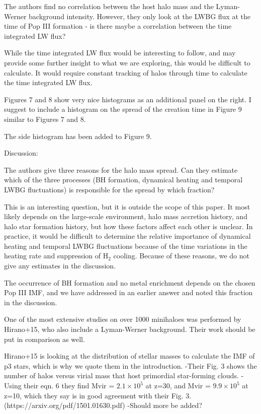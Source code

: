 \documentclass[11pt]{article}
\newenvironment{referee}[1][]{%
    \ignorespaces%
    \begin{mdframed}[style=myquotestyle,#1]%
}{%
    \end{mdframed}%
    \ignorespacesafterend%
}%
\begin{document}
\begin{referee}
The authors find no correlation between the host halo mass and the Lyman-Werner background intensity. However, they only look at the LWBG flux at the time of Pop III formation - is there maybe a correlation between the time integrated LW flux?
\end{referee}
While the time integrated LW flux would be interesting to follow, and may provide some further insight to what we are exploring, this would be difficult to calculate. It would require constant tracking of halos through time to calculate the time integrated LW flux. 

\begin{referee}
Figures 7 and 8 show very nice histograms as an additional panel on the right.  I suggest to include a histogram on the spread of the creation time in Figure 9 similar to Figures 7 and 8.
\end{referee}
The side histogram has been added to Figure 9. 

\begin{referee}
Discussion:

The authors give three reasons for the halo mass spread. Can they estimate which of the three processes (BH formation, dynamical heating and temporal LWBG fluctuations) is responsible for the spread by which fraction?
\end{referee}

This is an interesting question, but it is outside the scope of this paper.  It most likely depends on the large-scale environment, halo mass accretion history, and halo star formation history, but how these factors affect each other is unclear.  In practice, it would be difficult to determine the relative importance of dynamical heating and temporal LWBG fluctuations because of the time variations in the heating rate and suppression of H$_2$ cooling.  Because of these reasons, we do not give any estimates in the discussion.

The occurrence of BH formation and no metal enrichment depends on the chosen Pop III IMF, and we have addressed in an earlier answer and noted this fraction in the discussion.

\begin{referee}
One of the most extensive studies on over 1000 minihaloes was performed by Hirano+15, who also include a Lyman-Werner background. Their work should be put in comparison as well.
\end{referee}
Hirano+15 is looking at the distribution of stellar masses to calculate the IMF of p3 stars, which is why we quote them in the introduction. 
-Their Fig. 3 shows the number of halos versus virial mass that host primordial star-forming clouds. 
-Using their eqn. 6 they find Mvir = $2.1 \times 10^5$ at z=30, and Mvir = $9.9 \times 10^5$ at z=10, which they say is in good agreement with their Fig. 3. 
(https://arxiv.org/pdf/1501.01630.pdf)
-Should more be added?
\end{document}
